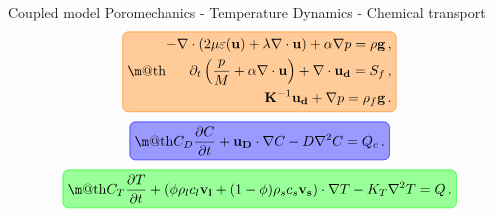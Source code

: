 \documentclass{beamer}
\makeatletter
\renewcommand{\boxed}[2]{\textcolor{#2}{%
\tikz[baseline={([yshift=-1ex]current bounding box.center)}] \node [rectangle, minimum width=1ex,rounded corners,fill=#2!40,draw] {\normalcolor\m@th$\displaystyle#1$};}}
\makeatother
\begin{document}
\begin{frame}{Coupled model}
Poromechanics - Temperature Dynamics - Chemical transport
	\begin{equation*}\boxed{
	 \begin{split}
	   	-\nabla \cdot \left(  2\mu\varepsilon (\mathbf{u}) + \lambda\nabla\cdot \mathbf{u}\right) + \alpha \nabla p=\rho\mathbf{g} \label{momentum}\, ,\\
 	\partial_t \left(\frac{p}{M} + \alpha \nabla \cdot \mathbf{u}\right)+ \nabla\cdot \mathbf{u_d}=S_f\,,\\ 
 	\mathbf{K}^{-1}\mathbf{u_d} + \nabla p = \rho_f\mathbf{g}\,.\\
	 \end{split}}{orange}
	\end{equation*}
	\begin{equation*}\boxed{
 	C_D\frac{\partial C}{\partial t} +
 	\mathbf{u_D} \cdot \nabla C- D\nabla^2 C 
 	= Q_c\,.}{blue}
 	\end{equation*}
	\begin{equation*}\boxed{
 	C_T\frac{\partial T}{\partial t} +
 	\left(  \phi\rho_l c_l \mathbf{v_l} 
 	+  (1 - \phi)\rho_s c_s \mathbf{v_s} \right)\cdot \nabla T- K_T \nabla^2 T 
 	= Q\,.}{green}
 	\end{equation*}
\end{frame}
\end{document}
